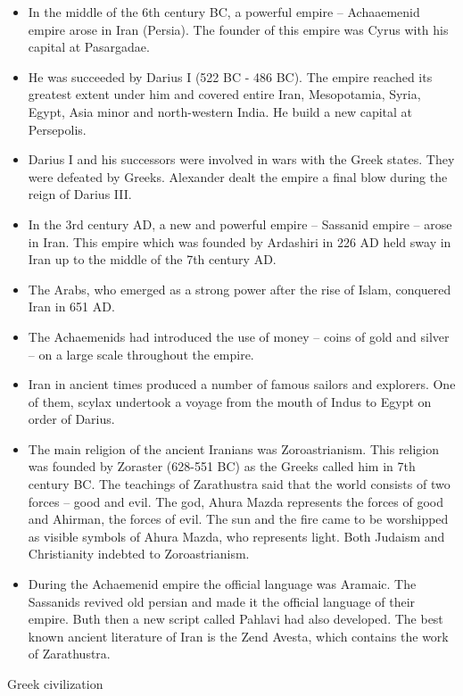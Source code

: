 \documentclass[
  openany]{book}
\providecommand{\tightlist}{%
  \setlength{\itemsep}{0pt}\setlength{\parskip}{0pt}}
\begin{document}
\begin{itemize}
\tightlist
\item
  In the middle of the 6th century BC, a powerful empire -- Achaaemenid empire arose in Iran (Persia). The founder of this empire was Cyrus with his capital at Pasargadae.
\item
  He was succeeded by Darius I (522 BC - 486 BC). The empire reached its greatest extent under him and covered entire Iran, Mesopotamia, Syria, Egypt, Asia minor and north-western India. He build a new capital at Persepolis.
\item
  Darius I and his successors were involved in wars with the Greek states. They were defeated by Greeks. Alexander dealt the empire a final blow during the reign of Darius III.
\item
  In the 3rd century AD, a new and powerful empire -- Sassanid empire -- arose in Iran. This empire which was founded by Ardashiri in 226 AD held sway in Iran up to the middle of the 7th century AD.
\item
  The Arabs, who emerged as a strong power after the rise of Islam, conquered Iran in 651 AD.
\item
  The Achaemenids had introduced the use of money -- coins of gold and silver -- on a large scale throughout the empire.
\item
  Iran in ancient times produced a number of famous sailors and explorers. One of them, scylax undertook a voyage from the mouth of Indus to Egypt on order of Darius.
\item
  The main religion of the ancient Iranians was Zoroastrianism. This religion was founded by Zoraster (628-551 BC) as the Greeks called him in 7th century BC. The teachings of Zarathustra said that the world consists of two forces -- good and evil. The god, Ahura Mazda represents the forces of good and Ahirman, the forces of evil. The sun and the fire came to be worshipped as visible symbols of Ahura Mazda, who represents light. Both Judaism and Christianity indebted to Zoroastrianism.
\item
  During the Achaemenid empire the official language was Aramaic. The Sassanids revived old persian and made it the official language of their empire. Buth then a new script called Pahlavi had also developed. The best known ancient literature of Iran is the Zend Avesta, which contains the work of Zarathustra.
\end{itemize}

Greek civilization
\end{document}
